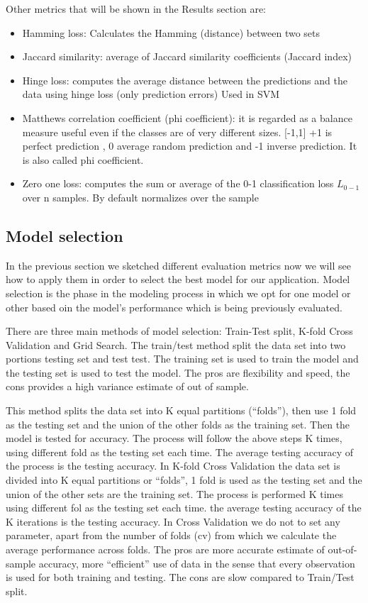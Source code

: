 \documentclass[12pt]{report}
\begin{document}
Other metrics that will be shown in the Results section are:
\begin{itemize}
	\item Hamming loss: Calculates the Hamming (distance) between two sets
	\item Jaccard similarity: average of Jaccard similarity coefficients (Jaccard index)
	\item Hinge loss: computes the average distance between the predictions and the data using hinge loss (only prediction errors) Used in SVM
	\item Matthews correlation coefficient (phi coefficient): it is regarded as a balance measure useful even if the classes are of very different sizes. [-1,1] +1 is perfect prediction , 0 average random prediction and -1 inverse prediction. It is also called phi coefficient.
	\item Zero one loss: computes the sum or average of the 0-1 classification loss $L_{0-1}$ over n samples. By default normalizes over the sample
\end{itemize}

\subsection{Model selection}
In the previous section we sketched different evaluation metrics now we will see how to apply them in order to select the best model for our application. 
Model selection is the phase in the modeling process in which we opt for one model or other based oin the model's performance which is being previously evaluated.

There are three main methods of model selection: Train-Test split, K-fold Cross Validation and Grid Search.
The train/test method split the data set into two portions testing set and test test. The training set is used to train the model and the testing set is used to test the model. The pros are flexibility and speed, the cons provides a high  variance estimate of out of sample. 

This method splits the data set into K equal partitions (“folds”), then use 1 fold as the testing set and the union of the other folds as the training set. Then the model is tested for accuracy. The process will follow the above steps K times, using different fold as the testing set each time. The average testing accuracy of the process is the testing accuracy.
In K-fold Cross Validation the data set is divided into K equal partitions or “folds”, 1 fold is used as the testing set and the union of the other sets are the training set. The process is performed K times using different fol as the testing set each time. the average testing accuracy of the K iterations is the testing accuracy.
In Cross Validation we do not to set any parameter, apart from the number of folds (cv) from which we calculate the average performance across folds. The pros are more accurate estimate of out-of-sample accuracy, more “efficient” use of data in the sense that every observation is used for both training and testing. The cons are slow compared to Train/Test split.
\end{document}
